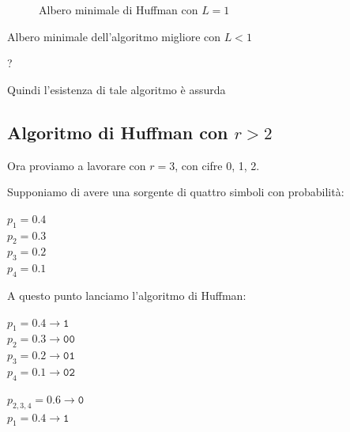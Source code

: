 \begin{dimostrazione}
	\begin{multicols}{2}

	\begin{figure}[H]
		\centering
		\caption*{\small{Albero minimale di Huffman con $L = 1$}}
	\end{figure}

	\small{Albero minimale dell'algoritmo migliore con $L<1$}
\begin{center}
		\Huge{?}
\end{center}	



	\end{multicols}

Quindi l'esistenza di tale algoritmo è assurda
\end{dimostrazione}

\subsection*{Algoritmo di Huffman con $r>2$}

Ora proviamo a lavorare con $r=3$, con cifre 0, 1, 2.

Supponiamo di avere una sorgente di quattro simboli con probabilità:
\begin{center}
	$p_1 = 0.4$\\
	$p_2 = 0.3$\\
	$p_3 = 0.2$\\
	$p_4 = 0.1$
\end{center}

A questo punto lanciamo l'algoritmo di Huffman:


\begin{multicols}{2}
	\begin{center}
			$p_1 = 0.4 \rightarrow \texttt{1}$\\
			$p_2 = 0.3 \rightarrow \texttt{00}$\\
			$p_3 = 0.2 \rightarrow \texttt{01}$\\
			$p_4 = 0.1 \rightarrow \texttt{02}$\\
		\end{center}
		
		\columnbreak
		
		\begin{center}
			$p_{2,3,4} = 0.6 \rightarrow \texttt{0}$\\
			$p_1 = 0.4 \rightarrow \texttt{1}$\\

		\end{center}  		
\end{multicols}


